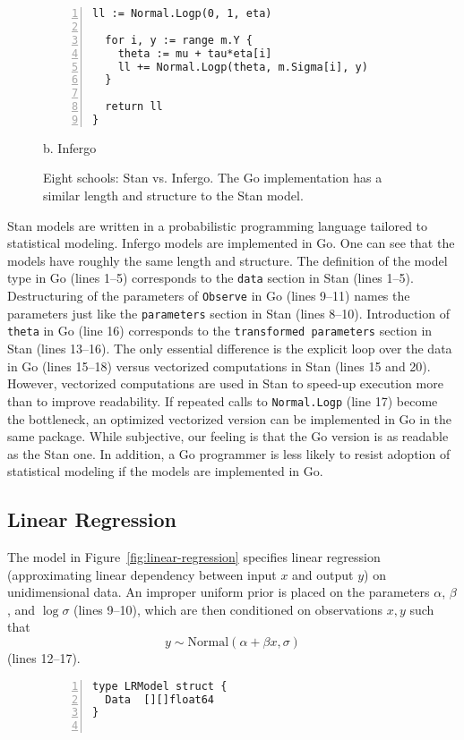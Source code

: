 \documentclass[sigplan,screen]{acmart}
\begin{document}
\begin{sloppypar}
\begin{figure*}
\begin{minipage}[t]{0.5\textwidth}
\begin{lstlisting}[xleftmargin=11pt,framexleftmargin=10pt,numbers=left]
  ll := Normal.Logp(0, 1, eta)

  for i, y := range m.Y {
    theta := mu + tau*eta[i]
    ll += Normal.Logp(theta, m.Sigma[i], y)
  }

  return ll
}
\end{lstlisting}
\centering
b. Infergo
  \end{minipage}
  \caption{Eight schools: Stan vs. Infergo. The Go implementation
  has a similar length and structure to the Stan model.}
  \label{fig:eight-schools}
\end{figure*}

Stan models are written in a probabilistic programming language
tailored to statistical modeling. Infergo models are implemented
in Go. One can see that the models have roughly the same length
and structure. The definition of the model type in Go (lines
1--5) corresponds to the \lstinline{data} section in Stan (lines
1--5). Destructuring of the parameters of \lstinline{Observe} in
Go (lines 9--11) names the parameters just like the
\lstinline{parameters} section in Stan (lines 8--10).
Introduction of \lstinline{theta} in Go (line 16) corresponds to
the \lstinline{transformed parameters} section in Stan (lines
13--16). The only essential difference is the explicit loop over
the data in Go (lines 15--18) versus vectorized computations in
Stan (lines 15 and 20). However, vectorized computations are used
in Stan to speed-up execution more than to improve readability.
If repeated calls to \lstinline{Normal.Logp} (line 17) become
the bottleneck, an optimized vectorized version can be
implemented in Go in the same package. While subjective, our
feeling is that the Go version is as readable as the Stan one.
In addition, a Go programmer is less likely to resist adoption
of statistical modeling if the models are implemented in Go.

\subsection{Linear Regression}
\label{sec:linear-regression}

The model in Figure~\ref{fig:linear-regression} specifies linear
regression (approximating linear dependency between input $x$
and output $y$) on unidimensional data. An improper uniform
prior is placed on the parameters $\alpha$,
$\beta$, and $\log \sigma$ (lines 9--10), which are then
conditioned on observations $x, y$ such that
\begin{equation}
y \sim \mathrm{Normal}(\alpha + \beta x, \sigma)
  \label{eqn:linear-regression-1}
\end{equation}
(lines 12--17).
\begin{figure}
\begin{lstlisting}[xleftmargin=11pt,framexleftmargin=10pt,numbers=left]
type LRModel struct {
  Data  [][]float64
}


\end{lstlisting}
\end{figure}
\end{sloppypar}
\end{document}
